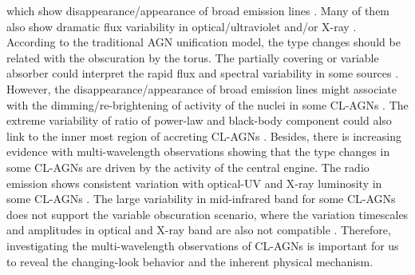 \documentclass[twocolumn]{aastex63}
\begin{document}
which show disappearance/appearance of broad emission lines \citep[e.g.][]{2016MNRAS.457..389M,2019MNRAS.486..123R}. Many of them also show dramatic flux variability in optical/ultraviolet and/or X-ray \citep[e.g.][]{2016MNRAS.461.1927P,2017ApJ...846L...7S,2019MNRAS.483L..88P}. According to the traditional AGN unification model, the type changes should be related with the obscuration by the torus. The partially covering or variable absorber could interpret the rapid flux and spectral variability in some sources \citep[e.g.][]{2013MNRAS.436.1615M,2014MNRAS.443.2862A,2015ApJ...815...55R,2018MNRAS.481.2470T}. However, the disappearance/appearance of broad emission lines might associate with the dimming/re-brightening of activity of the nuclei in some CL-AGNs \citep[e.g.][]{2014ApJ...796..134D,2018MNRAS.480.3898N,2019ApJ...885...44D}. The extreme variability of ratio of power-law and black-body component could also link to the inner most region of accreting CL-AGNs \citep[e.g.][]{2019ApJ...883...94T,2020ApJ...898L...1R}. Besides, there is increasing evidence with multi-wavelength observations showing that the type changes in some CL-AGNs are driven by the activity of the central engine. The radio emission shows consistent variation with optical-UV and X-ray luminosity in some CL-AGNs \citep[e.g.][]{2016MNRAS.460..304K}. The large variability in mid-infrared band for some CL-AGNs \citep[e.g.][]{2017ApJ...846L...7S,2018ApJ...864...27S} does not support the variable obscuration scenario, where the variation timescales and amplitudes in optical and X-ray band are also not compatible \citep[e.g.][]{2020ApJ...890L..29A}. Therefore, investigating the multi-wavelength observations of CL-AGNs is important for us to reveal the changing-look behavior and the inherent physical mechanism.
\end{document}
